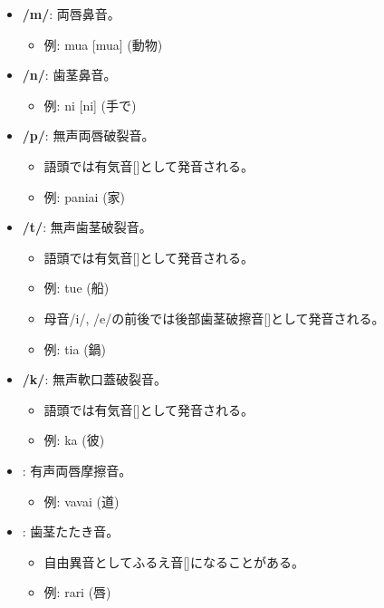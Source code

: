 \begin{itemize}
    \item \textbf{/m/}: 両唇鼻音。
    \begin{itemize}
        \item 例: mua [mua] (動物)
    \end{itemize}

    \item \textbf{/n/}: 歯茎鼻音。
    \begin{itemize}
        \item 例: ni [ni] (手で)
    \end{itemize}

    \item \textbf{/p/}: 無声両唇破裂音。
    \begin{itemize}
        \item 語頭では有気音[]として発音される。
        \item 例:  paniai  (家)
    \end{itemize}

    \item \textbf{/t/}: 無声歯茎破裂音。
    \begin{itemize}
        \item 語頭では有気音[]として発音される。
        \item 例: tue \textipa{[t\super{h}ue]} (船)
        \item 母音/i/, /e/の前後では後部歯茎破擦音[]として発音される。
        \item 例: tia \textipa{[tS\super{h}ia]} (鍋)
    \end{itemize}

    \item \textbf{/k/}: 無声軟口蓋破裂音。
    \begin{itemize}
        \item 語頭では有気音[]として発音される。
        \item 例: ka \textipa{[k\super{h}a]} (彼)
    \end{itemize}

    \item \textbf{}: 有声両唇摩擦音。
    \begin{itemize}
        \item 例: vavai \textipa{[BaBai]} (道)
    \end{itemize}
    
    \item \textbf{}: 歯茎たたき音。
    \begin{itemize}
        \item 自由異音としてふるえ音[]になることがある。
        \item 例: rari \textipa{[RaRi]} (唇)
    \end{itemize}
\end{itemize}